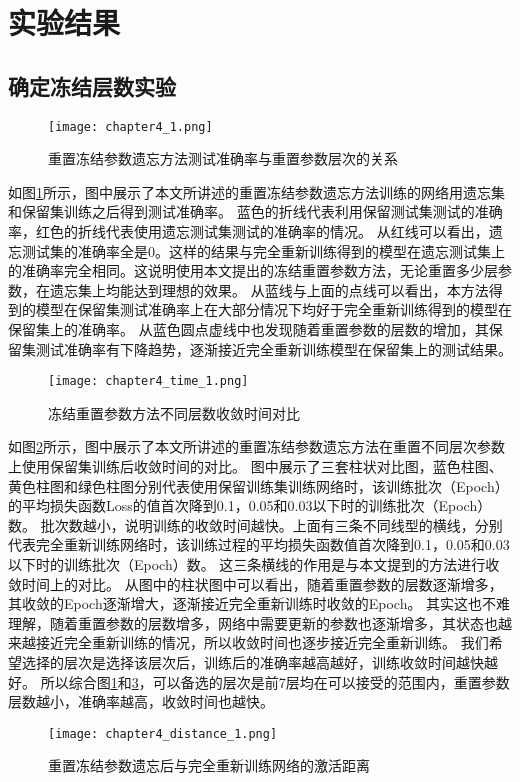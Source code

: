 \section{实验结果}
\subsection{确定冻结层数实验}
\begin{figure}
    \centering
    \texttt{[image: chapter4\_1.png]}
    \caption{重置冻结参数遗忘方法测试准确率与重置参数层次的关系}
    \label{fig:chapter4_1}
\end{figure}

如图\ref{fig:chapter4_1}所示，图中展示了本文所讲述的重置冻结参数遗忘方法训练的网络用遗忘集和保留集训练之后得到测试准确率。
蓝色的折线代表利用保留测试集测试的准确率，红色的折线代表使用遗忘测试集测试的准确率的情况。
从红线可以看出，遗忘测试集的准确率全是0。这样的结果与完全重新训练得到的模型在遗忘测试集上的准确率完全相同。这说明使用本文提出的冻结重置参数方法，无论重置多少层参数，在遗忘集上均能达到理想的效果。
从蓝线与上面的点线可以看出，本方法得到的模型在保留集测试准确率上在大部分情况下均好于完全重新训练得到的模型在保留集上的准确率。
从蓝色圆点虚线中也发现随着重置参数的层数的增加，其保留集测试准确率有下降趋势，逐渐接近完全重新训练模型在保留集上的测试结果。

\begin{figure}
    \centering
    \texttt{[image: chapter4\_time\_1.png]}
    \caption{冻结重置参数方法不同层数收敛时间对比}
    \label{fig:chapter4_time_1}
\end{figure}

如图\ref{fig:chapter4_time_1}所示，图中展示了本文所讲述的重置冻结参数遗忘方法在重置不同层次参数上使用保留集训练后收敛时间的对比。
图中展示了三套柱状对比图，蓝色柱图、黄色柱图和绿色柱图分别代表使用保留训练集训练网络时，该训练批次（Epoch）的平均损失函数Loss的值首次降到0.1，0.05和0.03以下时的训练批次（Epoch）数。
批次数越小，说明训练的收敛时间越快。上面有三条不同线型的横线，分别代表完全重新训练网络时，该训练过程的平均损失函数值首次降到0.1，0.05和0.03以下时的训练批次（Epoch）数。
这三条横线的作用是与本文提到的方法进行收敛时间上的对比。
从图中的柱状图中可以看出，随着重置参数的层数逐渐增多，其收敛的Epoch逐渐增大，逐渐接近完全重新训练时收敛的Epoch。
其实这也不难理解，随着重置参数的层数增多，网络中需要更新的参数也逐渐增多，其状态也越来越接近完全重新训练的情况，所以收敛时间也逐步接近完全重新训练。
我们希望选择的层次是选择该层次后，训练后的准确率越高越好，训练收敛时间越快越好。
所以综合图\ref{fig:chapter4_1}和\ref{fig:chapter4_distance_1}，可以备选的层次是前7层均在可以接受的范围内，重置参数层数越小，准确率越高，收敛时间也越快。
\begin{figure}
    \centering
    \texttt{[image: chapter4\_distance\_1.png]}
    \caption{重置冻结参数遗忘后与完全重新训练网络的激活距离}
    \label{fig:chapter4_distance_1}
\end{figure}


